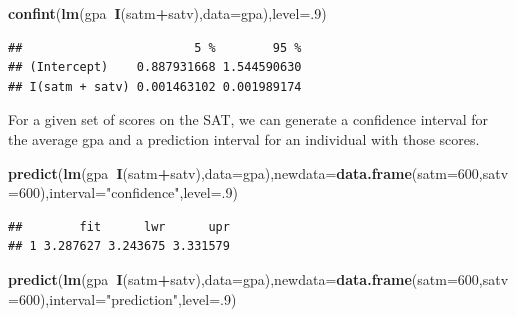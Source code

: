 \documentclass[]{book}
\newenvironment{Shaded}{\begin{snugshade}}{\end{snugshade}}
\newcommand{\KeywordTok}[1]{\textcolor[rgb]{0.13,0.29,0.53}{\textbf{#1}}}
\newcommand{\DataTypeTok}[1]{\textcolor[rgb]{0.13,0.29,0.53}{#1}}
\newcommand{\DecValTok}[1]{\textcolor[rgb]{0.00,0.00,0.81}{#1}}
\newcommand{\StringTok}[1]{\textcolor[rgb]{0.31,0.60,0.02}{#1}}
\newcommand{\OperatorTok}[1]{\textcolor[rgb]{0.81,0.36,0.00}{\textbf{#1}}}
\newcommand{\NormalTok}[1]{#1}
\theoremstyle{definition}
\theoremstyle{definition}
\theoremstyle{definition}
\theoremstyle{remark}
\begin{document}
\begin{Shaded}
\begin{Highlighting}[]
\KeywordTok{confint}\NormalTok{(}\KeywordTok{lm}\NormalTok{(gpa}\OperatorTok{~}\KeywordTok{I}\NormalTok{(satm}\OperatorTok{+}\NormalTok{satv),}\DataTypeTok{data=}\NormalTok{gpa),}\DataTypeTok{level=}\NormalTok{.}\DecValTok{9}\NormalTok{)}
\end{Highlighting}
\end{Shaded}

\begin{verbatim}
##                        5 %        95 %
## (Intercept)    0.887931668 1.544590630
## I(satm + satv) 0.001463102 0.001989174
\end{verbatim}

For a given set of scores on the SAT, we can generate a confidence
interval for the average gpa and a prediction interval for an individual
with those scores.

\begin{Shaded}
\begin{Highlighting}[]
\KeywordTok{predict}\NormalTok{(}\KeywordTok{lm}\NormalTok{(gpa}\OperatorTok{~}\KeywordTok{I}\NormalTok{(satm}\OperatorTok{+}\NormalTok{satv),}\DataTypeTok{data=}\NormalTok{gpa),}\DataTypeTok{newdata=}\KeywordTok{data.frame}\NormalTok{(}\DataTypeTok{satm=}\DecValTok{600}\NormalTok{,}\DataTypeTok{satv=}\DecValTok{600}\NormalTok{),}\DataTypeTok{interval=}\StringTok{"confidence"}\NormalTok{,}\DataTypeTok{level=}\NormalTok{.}\DecValTok{9}\NormalTok{)}
\end{Highlighting}
\end{Shaded}

\begin{verbatim}
##        fit      lwr      upr
## 1 3.287627 3.243675 3.331579
\end{verbatim}

\begin{Shaded}
\begin{Highlighting}[]
\KeywordTok{predict}\NormalTok{(}\KeywordTok{lm}\NormalTok{(gpa}\OperatorTok{~}\KeywordTok{I}\NormalTok{(satm}\OperatorTok{+}\NormalTok{satv),}\DataTypeTok{data=}\NormalTok{gpa),}\DataTypeTok{newdata=}\KeywordTok{data.frame}\NormalTok{(}\DataTypeTok{satm=}\DecValTok{600}\NormalTok{,}\DataTypeTok{satv=}\DecValTok{600}\NormalTok{),}\DataTypeTok{interval=}\StringTok{"prediction"}\NormalTok{,}\DataTypeTok{level=}\NormalTok{.}\DecValTok{9}\NormalTok{)}
\end{Highlighting}
\end{Shaded}
\end{document}
